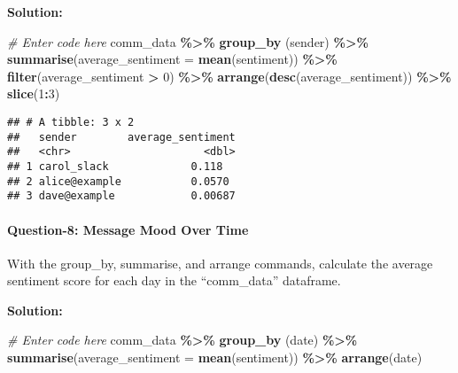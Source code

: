 \documentclass[
]{article}
\newenvironment{Shaded}{\begin{snugshade}}{\end{snugshade}}
\newcommand{\AttributeTok}[1]{\textcolor[rgb]{0.13,0.29,0.53}{#1}}
\newcommand{\CommentTok}[1]{\textcolor[rgb]{0.56,0.35,0.01}{\textit{#1}}}
\newcommand{\DecValTok}[1]{\textcolor[rgb]{0.00,0.00,0.81}{#1}}
\newcommand{\FunctionTok}[1]{\textcolor[rgb]{0.13,0.29,0.53}{\textbf{#1}}}
\newcommand{\NormalTok}[1]{#1}
\newcommand{\SpecialCharTok}[1]{\textcolor[rgb]{0.81,0.36,0.00}{\textbf{#1}}}
\begin{document}
\textbf{Solution:}

\begin{Shaded}
\begin{Highlighting}[]
\CommentTok{\# Enter code here}
\NormalTok{comm\_data }\SpecialCharTok{\%\textgreater{}\%} 
  \FunctionTok{group\_by}\NormalTok{ (sender) }\SpecialCharTok{\%\textgreater{}\%} 
  \FunctionTok{summarise}\NormalTok{(}\AttributeTok{average\_sentiment =} \FunctionTok{mean}\NormalTok{(sentiment)) }\SpecialCharTok{\%\textgreater{}\%}
  \FunctionTok{filter}\NormalTok{(average\_sentiment }\SpecialCharTok{\textgreater{}} \DecValTok{0}\NormalTok{) }\SpecialCharTok{\%\textgreater{}\%}
  \FunctionTok{arrange}\NormalTok{(}\FunctionTok{desc}\NormalTok{(average\_sentiment)) }\SpecialCharTok{\%\textgreater{}\%}
  \FunctionTok{slice}\NormalTok{(}\DecValTok{1}\SpecialCharTok{:}\DecValTok{3}\NormalTok{)}
\end{Highlighting}
\end{Shaded}

\begin{verbatim}
## # A tibble: 3 x 2
##   sender        average_sentiment
##   <chr>                     <dbl>
## 1 carol_slack             0.118  
## 2 alice@example           0.0570 
## 3 dave@example            0.00687
\end{verbatim}

\hypertarget{question-8-message-mood-over-time}{%
\paragraph{Question-8: Message Mood Over
Time}\label{question-8-message-mood-over-time}}

With the group\_by, summarise, and arrange commands, calculate the
average sentiment score for each day in the ``comm\_data'' dataframe.

\textbf{Solution:}

\begin{Shaded}
\begin{Highlighting}[]
\CommentTok{\# Enter code here}
\NormalTok{comm\_data }\SpecialCharTok{\%\textgreater{}\%} 
  \FunctionTok{group\_by}\NormalTok{ (date) }\SpecialCharTok{\%\textgreater{}\%} 
  \FunctionTok{summarise}\NormalTok{(}\AttributeTok{average\_sentiment =} \FunctionTok{mean}\NormalTok{(sentiment)) }\SpecialCharTok{\%\textgreater{}\%}
  \FunctionTok{arrange}\NormalTok{(date)}
\end{Highlighting}
\end{Shaded}
\end{document}
